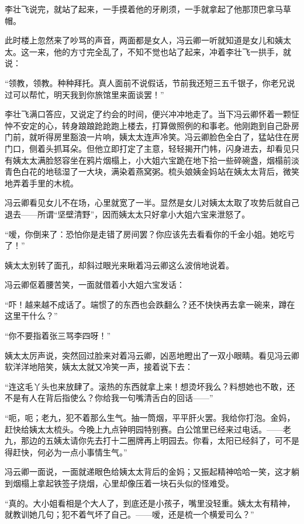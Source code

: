 \par 李壮飞说完，就站了起来，一手摸着他的牙刷须，一手就拿起了他那顶巴拿马草帽。
\par 此时楼上忽然来了吵骂的声音，两面都是女人，冯云卿一听就知道是女儿和姨太太。这一来，他的方寸完全乱了，不知不觉也站了起来，冲着李壮飞一拱手，就说：
\par “领教，领教。种种拜托。真人面前不说假话，节前我还短三五千银子，你老兄说过可以帮忙，明天我到你旅馆里来面谈罢！”
\par 李壮飞满口答应，又说定了约会的时间，便兴冲冲地走了。当下冯云卿怀着一颗怔忡不安定的心，转身踉踉跄跄跑上楼去，打算做照例的和事老。他刚跑到自己卧房门前，就听得房里豁浪一片响，姨太太连声冷笑。冯云卿脸色全白了，猛站住在房门口，侧着头抓耳朵。但他立即打定了主意，轻轻揭开门帏，闪身进去，却看见只有姨太太满脸怒容坐在鸦片烟榻上，小大姐六宝跪在地下拾一些碎碗盏，烟榻前淡青色白花的地毯湿了一大块，满染着燕窝粥。梳头娘姨金妈站在姨太太背后，微笑地弄着手里的木梳。
\par 冯云卿看见女儿不在场，心里就宽了一半。显然是女儿对姨太太取了攻势后就自己退去——所谓“坚壁清野”，因而姨太太只好拿小大姐六宝来泄怒了。
\par “嗳，你倒来了：恐怕你是走错了房间罢？你应该先去看看你的千金小姐。她吃亏了！”
\par 姨太太别转了面孔，却斜过眼光来瞅着冯云卿这么波俏地说着。
\par 冯云卿伛着腰苦笑，一面就借着小大姐六宝发话：
\par “吓！越来越不成话了。端惯了的东西也会跌翻么？还不快快再去拿一碗来，蹲在这里干什么？”
\par “你不要指着张三骂李四呀！”
\par 姨太太厉声说，突然回过脸来对着冯云卿，凶恶地瞪出了一双小眼睛。看见冯云卿软洋洋地陪笑，姨太太就又冷笑一声，接着说下去：
\par “连这毛丫头也来放肆了。滚热的东西就拿上来！想烫坏我么？料想她也不敢，还不是有人在背后指使么？你给我一句嘴清舌白的回话——”
\par “呃，呃；老九，犯不着那么生气。抽一筒烟，平平肝火罢。我给你打泡。金妈，赶快给姨太太梳头。今晚上九点钟明园特别赛。白公馆里已经来过电话。——老九，那边的五姨太请你先去打十二圈牌再上明园去。你看，太阳已经斜了，可不是得赶快，何必为一点小事情生气。”
\par 冯云卿一面说，一面就递眼色给姨太太背后的金妈；又振起精神哈哈一笑，这才躺到烟榻上拿起铁签子烧烟，心里却像压着一块石头似的怪难受。
\par “真的。大小姐看相是个大人了，到底还是小孩子，嘴里没轻重。姨太太有精神，就教训她几句；犯不着气坏了自己。——嗳，还是梳一个横爱司么？”
